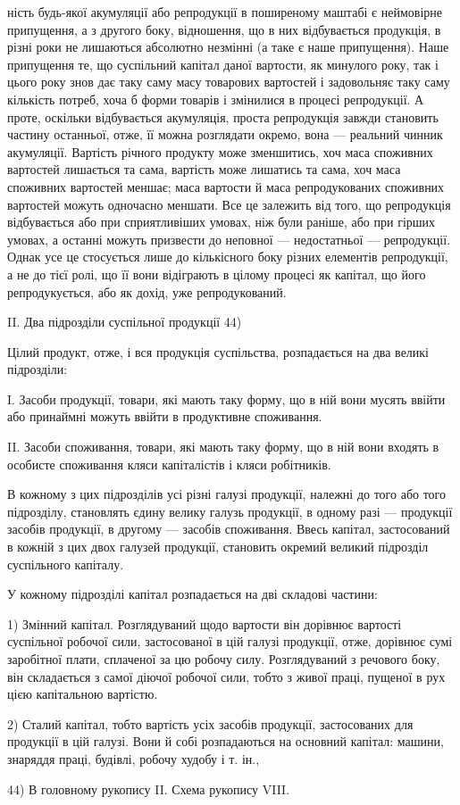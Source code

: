 ність будь-якої акумуляції або репродукції в поширеному маштабі є
неймовірне припущення, а з другого боку, відношення, що в них відбувається
продукція, в різні роки не лишаються абсолютно незмінні (а таке
є наше припущення). Наше припущення те, що суспільний капітал даної
вартости, як минулого року, так і цього року знов дає таку саму масу товарових вартостей і
задовольняє таку саму кількість потреб, хоча б форми товарів і змінилися в процесі репродукції. А
проте, оскільки відбувається акумуляція, проста репродукція завжди становить частину останньої,
отже, її можна розглядати окремо, вона — реальний чинник акумуляції. Вартість річного продукту може
зменшитись, хоч маса споживних вартостей лишається та сама, вартість може лишатись та сама, хоч маса
споживних вартостей меншає; маса вартости й маса репродукованих
споживних вартостей можуть одночасно меншати. Все це залежить
від того, що репродукція відбувається або при сприятливіших умовах,
ніж були раніше, або при гірших умовах, а останні можуть призвести до
неповної — недостатньої — репродукції. Однак усе це стосується лише до
кількісного боку різних елементів репродукції, а не до тієї ролі, що її
вони відіграють в цілому процесі як капітал, що його репродукується,
або як дохід, уже репродукований.

II. Два підрозділи суспільної продукції 44)

Цілий продукт, отже, і вся продукція суспільства, розпадається на
два великі підрозділи:

I. Засоби продукції, товари, які мають таку форму, що в ній
вони мусять ввійти або принаймні можуть ввійти в продуктивне споживання.

II. Засоби споживання, товари, які мають таку форму, що в
ній вони входять в особисте споживання кляси капіталістів і кляси робітників.

В кожному з цих підрозділів усі різні галузі продукції, належні до
того або того підрозділу, становлять єдину велику галузь продукції,
в одному разі — продукції засобів продукції, в другому — засобів споживання.
Ввесь капітал, застосований в кожній з цих двох галузей продукції,
становить окремий великий підрозділ суспільного капіталу.

У кожному підрозділі капітал розпадається на дві складові частини:

1) Змінний капітал. Розглядуваний щодо вартости він дорівнює
вартості суспільної робочої сили, застосованої в цій галузі продукції,
отже, дорівнює сумі заробітної плати, сплаченої за цю робочу силу.
Розглядуваний з речового боку, він складається з самої діючої робочої
сили, тобто з живої праці, пущеної в рух цією капітальною вартістю.

2) Сталий капітал, тобто вартість усіх засобів продукції, застосованих
для продукції в цій галузі. Вони й собі розпадаються на основний
капітал: машини, знаряддя праці, будівлі, робочу худобу і т. ін.,

44) В головному рукопису II. Схема рукопису VIII.
